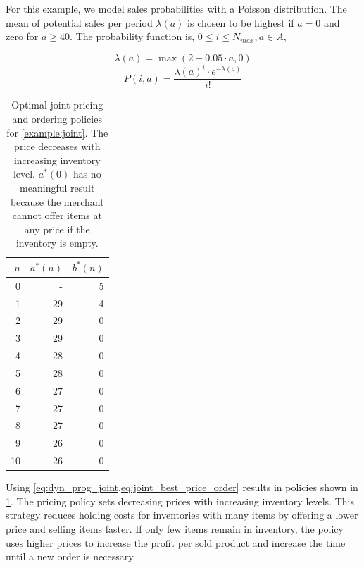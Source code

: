 For this example, we model sales probabilities with a Poisson distribution.
The mean of potential sales per period $\lambda(a)$ is chosen to be highest if $a = 0$ and zero for $a \geq 40$.
The probability function is, $0 \leq i \leq N_{max}, a \in A$,

\begin{equation}
\lambda(a) = \max(2 - 0.05 \cdot a, 0)
\end{equation}
\begin{equation}
P(i, a) = \frac{\lambda(a)^i \cdot e^{-\lambda(a)}}{i!}
\label{eq:example_joint_prob}
\end{equation}

\begin{table}[t]
	\centering
	\begin{tabular}{rrr}
		\toprule
		$n$ & $a^*(n)$ & $b^*(n)$ \\
		\midrule
		0 & - & 5 \\
		1 & 29 & 4 \\
		2 & 29 & 0 \\
		3 & 29 & 0\\
		4 & 28 & 0\\
		5 & 28 & 0\\
		6 & 27 & 0\\
		7 & 27 & 0\\
		8 & 27 & 0\\
		9 & 26 & 0\\
		10 & 26 & 0\\
		\bottomrule
	\end{tabular}
\caption[Numerical Example: Joint Pricing and Ordering Policy]{
Optimal joint pricing and ordering policies for \cref{example:joint}.
The price decreases with increasing inventory level.
$a^*(0)$ has no meaningful result because the merchant cannot offer items at any price if the inventory is empty.
}
\label{tab:example_joint}
\end{table}

Using \cref{eq:dyn_prog_joint,eq:joint_best_price_order} results in policies shown in \cref{tab:example_joint}.
The pricing policy sets decreasing prices with increasing inventory levels.
This strategy reduces holding costs for inventories with many items by offering a lower price and selling items faster.
If only few items remain in inventory, the policy uses higher prices to increase the profit per sold product and increase the time until a new order is necessary.

